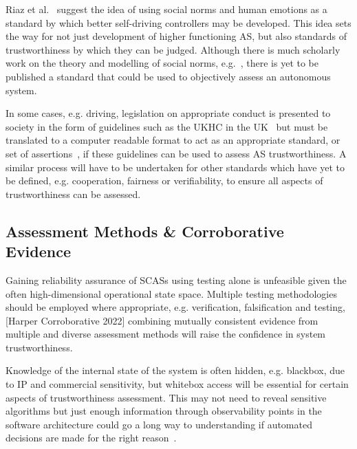 Riaz et al.~\cite{Riaz2018} suggest the idea of using social norms and human emotions as a standard by which better self-driving controllers may be developed. This idea sets the way for not just development of higher functioning AS, but also standards of trustworthiness by which they can be judged. Although there is much scholarly work on the theory and modelling of social norms, e.g.~\cite{hechter2001social}, there is yet to be published a standard that could be used to objectively assess an autonomous system. 

In some cases, e.g. driving, legislation on appropriate conduct is presented to society in the form of guidelines such as the UKHC in the UK~\cite{highwayCode} but must be translated to a computer readable format to act as an appropriate standard, or set of assertions~\cite{harper2021safety}, if these guidelines can be used to assess AS trustworthiness. A similar process will have to be undertaken for other standards which have yet to be defined, e.g. cooperation, fairness or verifiability, to ensure all aspects of trustworthiness can be assessed. 



\subsection{Assessment Methods \& Corroborative Evidence} \label{sec:AssFramVis-AssMthds}
Gaining reliability assurance of SCASs using testing alone is unfeasible given the often high-dimensional operational state space. Multiple testing methodologies should be employed where appropriate, e.g. verification, falsification and testing, [Harper Corroborative 2022] combining mutually consistent evidence from multiple and diverse assessment methods will raise the confidence in system trustworthiness.

Knowledge of the internal state of the system is often hidden, e.g. blackbox, due to IP and commercial sensitivity, but whitebox access will be essential for certain aspects of trustworthiness assessment. This may not need to reveal sensitive algorithms but just enough information through observability points in the software architecture could go a long way to understanding if automated decisions are made for the right reason~\cite{koopman2018toward}. 




